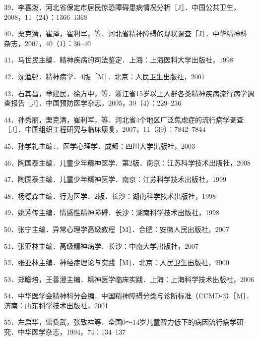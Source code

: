 39．李喜泼．河北省保定市居民惊恐障碍患病情况分析［J］．中国公共卫生，2008，11（24）：1366--1368

40．栗克清，崔泽，崔利军，等．河北省精神障碍的现状调查［J］．中华精神科杂志，2007，40（1）：36--40

41．马世民主编．精神疾病的司法鉴定．上海：上海医科大学出版社，1998

42．沈渔邨．精神病学．4版［M］．北京：人民卫生出版社，2001

43．石其昌，章建民，徐方中，等．浙江省15岁以上人群各类精神疾病流行病学调查报告［J］．中国预防医学杂志，2005，39（4）：229--236

44．孙秀丽，栗克清，崔利军，等．河北省4个地区广泛焦虑症的流行病学调查［J］．中国组织工程研究与临床康复，2007，11（39）：7842--7844

45．孙学礼主编．．医学心理学．成都：四川大学出版社，2003

46．陶国泰主编．儿童少年精神医学．第2版．南京：江苏科学技术出版社，2008

47．陶国泰主编．儿童少年精神医学．南京：江苏科学技术出版社，1999

48．杨德森主编．行为医学．2版．长沙：湖南科学技术出版社，1998

49．姚芳传主编．情感性精神障碍．长沙：湖南科学技术出版社，1998

50．张宁主编．异常心理学高级教程［M］．合肥：安徽人民出版社，2007

51．张亚林主编．高级精神病学．长沙：中南大学出版社，2007

52．张亚林主编．神经症理论与实践［M］．北京：人民卫生出版社，2000

53．郑瞻培，王善澄主编．精神医学临床实践．上海：上海科学技术出版社，2006

54．中华医学会精神科分会编．中国精神障碍分类与诊断标准（CCMD-3）［M］．济南：山东科学技术出版社，2001

55．左启华，雷负武，张致祥等．全国0～14岁儿童智力低下的病因流行病学研究．中华医学杂志，1994，74：134--137

